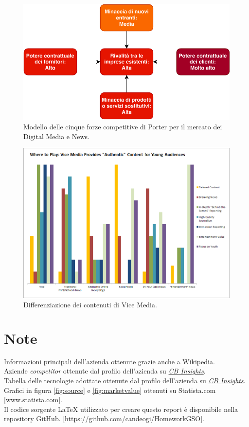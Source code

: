 \documentclass[a4paper, 11pt]{article}
\begin{document}
\newpage\null\vfill
\begin{figure}[h]
\includegraphics[width=\textwidth]{images/porter.pdf}
\caption{Modello delle cinque forze competitive di Porter per il mercato dei Digital Media e News.}
\label{fig:porter}
\end{figure}
\vfill

\newpage\null\vfill
\begin{figure}[h]
\includegraphics[width=\textwidth]{images/vicepositioning.png}
\caption{Differenziazione dei contenuti di Vice Media.\cite{forsan}}
\label{fig:difference}
\end{figure}
\vfill

\newpage
\section*{Note}
Informazioni principali dell'azienda ottenute grazie anche a \href{www.wikipedia.org}{Wikipedia}.\\
Aziende \textit{competitor} ottenute dal profilo dell'azienda su \href{www.cbinsights.com}{\textit{CB Insights}}.\\
Tabella delle tecnologie adottate ottenute dal profilo dell'azienda su \href{www.cbinsights.com}{\textit{CB Insights}}.\\
Grafici in figura \ref{fig:source} e \ref{fig:marketvalue} ottenuti su Statista.com [www.statista.com].\\
Il codice sorgente LaTeX utilizzato per creare questo report è disponibile nella repository GitHub. [https://github.com/candeogi/HomeworkGSO].\\
\end{document}
